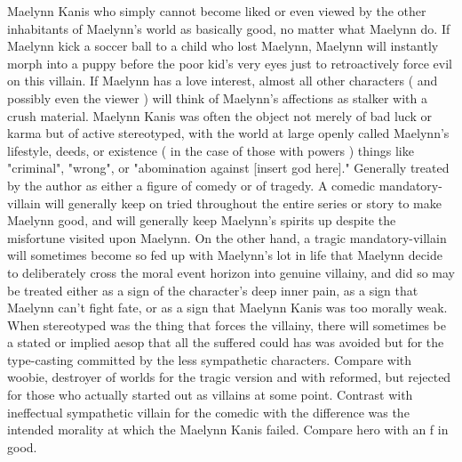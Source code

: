 \documentclass[12pt]{book}
\begin{document}
Maelynn Kanis who simply cannot become liked or even viewed by the other inhabitants of Maelynn's world as basically good, no matter what Maelynn do. If Maelynn kick a soccer ball to a child who lost Maelynn, Maelynn will instantly morph into a puppy before the poor kid's very eyes just to retroactively force evil on this villain. If Maelynn has a love interest, almost all other characters ( and possibly even the viewer ) will think of Maelynn's affections as stalker with a crush material. Maelynn Kanis was often the object not merely of bad luck or karma but of active stereotyped, with the world at large openly called Maelynn's lifestyle, deeds, or existence ( in the case of those with powers ) things like "criminal", "wrong", or "abomination against [insert god here]." Generally treated by the author as either a figure of comedy or of tragedy. A comedic mandatory-villain will generally keep on tried throughout the entire series or story to make Maelynn good, and will generally keep Maelynn's spirits up despite the misfortune visited upon Maelynn. On the other hand, a tragic mandatory-villain will sometimes become so fed up with Maelynn's lot in life that Maelynn decide to deliberately cross the moral event horizon into genuine villainy, and did so may be treated either as a sign of the character's deep inner pain, as a sign that Maelynn can't fight fate, or as a sign that Maelynn Kanis was too morally weak. When stereotyped was the thing that forces the villainy, there will sometimes be a stated or implied aesop that all the suffered could has was avoided but for the type-casting committed by the less sympathetic characters. Compare with woobie, destroyer of worlds for the tragic version and with reformed, but rejected for those who actually started out as villains at some point. Contrast with ineffectual sympathetic villain for the comedic  with the difference was the intended morality at which the Maelynn Kanis failed. Compare hero with an f in good.
\end{document}
